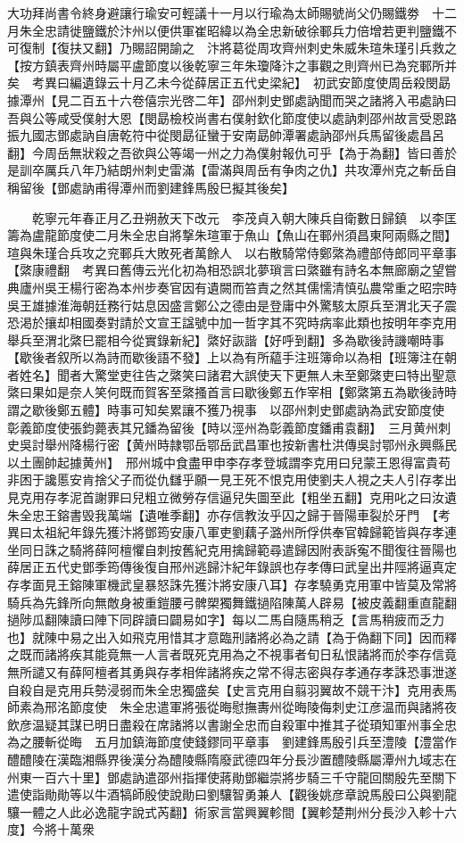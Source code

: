大功拜尚書令終身避讓行瑜安可輕議十一月以行瑜為太師賜號尚父仍賜鐵劵　十二月朱全忠請徙鹽鐵於汴州以便供軍崔昭緯以為全忠新破徐鄆兵力倍增若更判鹽鐵不可復制【復扶又翻】乃賜詔開諭之　汴將葛從周攻齊州刺史朱威朱瑄朱瑾引兵救之【按方鎮表齊州時屬平盧節度以後乾寧三年朱瓊降汴之事觀之則齊州已為兖鄆所并矣　考異曰編遺錄云十月乙未今從薛居正五代史梁紀】　初武安節度使周岳殺閔勗據潭州【見二百五十六卷僖宗光啓二年】邵州刺史鄧處訥聞而哭之諸將入弔處訥曰吾與公等咸受僕射大恩【閔勗檢校尚書右僕射欽化節度使以處訥刺邵州故言受恩路振九國志鄧處訥自唐乾符中從閔勗征蠻于安南勗帥潭署處訥邵州兵馬留後處昌呂翻】今周岳無狀殺之吾欲與公等竭一州之力為僕射報仇可乎【為于為翻】皆曰善於是訓卒厲兵八年乃結朗州刺史雷滿【雷滿與周岳有争肉之仇】共攻潭州克之斬岳自稱留後【鄧處訥甫得潭州而劉建鋒馬殷巳擬其後矣】

　　乾寧元年春正月乙丑朔赦天下改元　李茂貞入朝大陳兵自衛數日歸鎮　以李匡籌為盧龍節度使二月朱全忠自將撃朱瑄軍于魚山【魚山在鄆州須昌東阿兩縣之間】瑄與朱瑾合兵攻之兖鄆兵大敗死者萬餘人　以右散騎常侍鄭綮為禮部侍郎同平章事【綮康禮翻　考異曰舊傳云光化初為相恐誤北夢瑣言曰綮雖有詩名本無廊廟之望嘗典廬州吳王楊行密為本州步奏官因有遺闕而笞責之然其儒懦清慎弘農常重之昭宗時吳王雄據淮海朝廷務行姑息因盛言鄭公之德由是登庸中外驚駭太原兵至渭北天子震恐渇於攘却相國奏對請於文宣王諡號中加一哲字其不究時病率此類也按明年李克用舉兵至渭北綮巳罷相今從實錄新紀】綮好詼諧【好呼到翻】多為歇後詩譏嘲時事【歇後者叙所以為詩而歇後語不發】上以為有所藴手注班簿命以為相【班簿注在朝者姓名】聞者大驚堂吏往告之綮笑曰諸君大誤使天下更無人未至鄭綮吏曰特出聖意綮曰果如是奈人笑何既而賀客至綮搔首言曰歇後鄭五作宰相【鄭綮第五為歇後詩時謂之歇後鄭五體】時事可知矣累讓不獲乃視事　以邵州刺史鄧處訥為武安節度使　彰義節度使張鈞薨表其兄鐇為留後【時以涇州為彰義節度鐇甫袁翻】　三月黄州刺史吳討舉州降楊行密【黄州時隷鄂岳鄂岳武昌軍也按新書杜洪傳吳討鄂州永興縣民以土團帥起據黄州】　邢州城中食盡甲申李存孝登城謂李克用曰兒蒙王恩得富貴苟非困于讒慝安肯捨父子而從仇讎乎願一見王死不恨克用使劉夫人視之夫人引存孝出見克用存孝泥首謝罪曰兒粗立微勞存信逼兒失圖至此【粗坐五翻】克用叱之曰汝遺朱全忠王鎔書毁我萬端【遺唯季翻】亦存信教汝乎囚之歸于晉陽車裂於牙門　【考異曰太祖紀年錄先獲汴將鄧筠安康八軍吏劉藕子潞州所俘供奉官韓歸範皆與存孝連坐同日誅之騎將薛阿檀懼自刺按舊紀克用擒歸範尋遣歸因附表訴寃不聞復往晉陽也薛居正五代史鄧季筠傳後復自邢州逃歸汴紀年錄誤也存孝傳曰武皇出井陘將逼真定存孝面見王鎔陳軍機武皇暴怒誅先獲汴將安康八耳】存孝驍勇克用軍中皆莫及常將騎兵為先鋒所向無敵身被重鎧腰弓髀槊獨舞鐵撾陷陳萬人辟易【被皮義翻重直龍翻撾陟瓜翻陳讀曰陣下同辟讀曰闢易如字】每以二馬自隨馬稍乏【言馬稍疲而乏力也】就陳中易之出入如飛克用惜其才意臨刑諸將必為之請【為于偽翻下同】因而釋之既而諸將疾其能竟無一人言者既死克用為之不視事者旬日私恨諸將而於李存信竟無所譴又有薛阿檀者其勇與存孝相侔諸將疾之常不得志密與存孝通存孝誅恐事泄遂自殺自是克用兵勢浸弱而朱全忠獨盛矣【史言克用自翦羽翼故不競干汴】克用表馬師素為邢洺節度使　朱全忠遣軍將張從晦慰撫夀州從晦陵侮刺史江彦温而與諸將夜飲彦温疑其謀已明日盡殺在席諸將以書謝全忠而自殺軍中推其子從頊知軍州事全忠為之腰斬從晦　五月加鎮海節度使錢鏐同平章事　劉建鋒馬殷引兵至澧陵【澧當作醴醴陵在漢臨湘縣界後漢分為醴陵縣隋廢武德四年分長沙置醴陵縣屬潭州九域志在州東一百六十里】鄧處訥遣邵州指揮使蔣勛鄧繼崇將步騎三千守龍回關殷先至關下遣使詣勛勛等以牛酒犒師殷使說勛曰劉驤智勇兼人【觀後姚彦章說馬殷曰公與劉龍驤一體之人此必逸龍字說式芮翻】術家言當興翼軫間【翼軫楚荆州分長沙入軫十六度】今將十萬衆